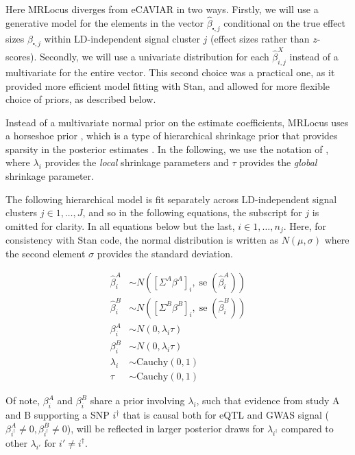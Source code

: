 \documentclass[11pt]{article}
\DeclareMathOperator{\se}{\textrm{se}}
\begin{document}
Here MRLocus diverges from eCAVIAR in two ways. Firstly, we will use a
generative model for the elements in the vector
$\widehat{\beta}_{\centerdot,j}$ conditional on the true effect sizes
$\beta_{\centerdot,j}$ within LD-independent signal cluster
$j$ (effect sizes rather than $z$-scores).
Secondly, we will use a univariate distribution for each
$\widehat{\beta}^X_{i,j}$ instead of a multivariate for the entire
vector. This second choice was a practical one, as it provided more
efficient model fitting with Stan, and allowed for more flexible
choice of priors, as described below. 

Instead of a multivariate normal prior on the estimate coefficients,
MRLocus uses a horseshoe prior \citep{horseshoe1,horseshoe2}, which is
a type of hierarchical shrinkage prior that provides sparsity in the
posterior estimates \citep{hiershrink}. In the following, we use the
notation of \citet{horseshoe1}, where $\lambda_i$ provides the
\emph{local} shrinkage parameters and $\tau$ provides the
\emph{global} shrinkage parameter.

The following hierarchical model is fit separately across
LD-independent signal clusters $j \in 1,\dots,J$, and so in the
following equations, the subscript for $j$ is omitted for clarity. In
all equations below but the last, $i \in 1,\dots,n_j$. Here, for
consistency with Stan code, the normal distribution is written as
$N(\mu,\sigma)$ where the second element $\sigma$ provides the
standard deviation. 

\begin{align}
  \widehat{\beta}^A_i &\sim N([\Sigma^A \beta^A]_i, \se(\widehat{\beta}^A_i)) \\
  \widehat{\beta}^B_i &\sim N([\Sigma^B \beta^B]_i, \se(\widehat{\beta}^B_i)) \\
  \beta_i^A &\sim N(0, \lambda_i \tau) \\
  \beta_i^B &\sim N(0, \lambda_i \tau) \\
  \lambda_i &\sim \textrm{Cauchy}(0,1) \\
  \tau &\sim \textrm{Cauchy}(0,1)
\end{align}

Of note, $\beta_i^A$ and $\beta_i^B$ share a prior involving
$\lambda_i$, such that evidence from study A and B supporting a
SNP $i^\dagger$ that is causal both for eQTL and GWAS signal
($\beta_{i^\dagger}^A \ne 0, \beta_{i^\dagger}^B \ne 0$),
will be reflected in larger posterior draws for $\lambda_{i^\dagger}$
compared to other $\lambda_{i'}$ for $i' \ne i^\dagger$.
\end{document}
